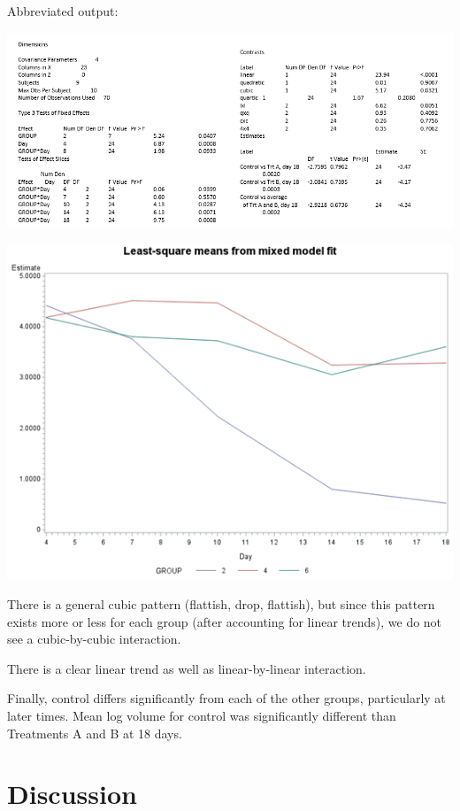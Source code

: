 \documentclass[
  9pt,
  ignorenonframetext,
]{beamer}
\begin{document}
\begin{frame}{Abbreviated output:}
\protect\hypertarget{abbreviated-output}{}
\begin{center}\includegraphics[width=1\linewidth]{figs_L11/f5} \end{center}
\end{frame}

\begin{frame}{}
\protect\hypertarget{section-4}{}
\begin{center}\includegraphics[width=0.5\linewidth]{figs_L11/f6} \end{center}

There is a general cubic pattern (flattish, drop, flattish), but since
this pattern exists more or less for each group (after accounting for
linear trends), we do not see a cubic-by-cubic interaction.

There is a clear linear trend as well as linear-by-linear interaction.

Finally, control differs significantly from each of the other groups,
particularly at later times. Mean log volume for control was
significantly different than Treatments A and B at 18 days.
\end{frame}

\hypertarget{discussion}{%
\section{Discussion}\label{discussion}}
\end{document}
